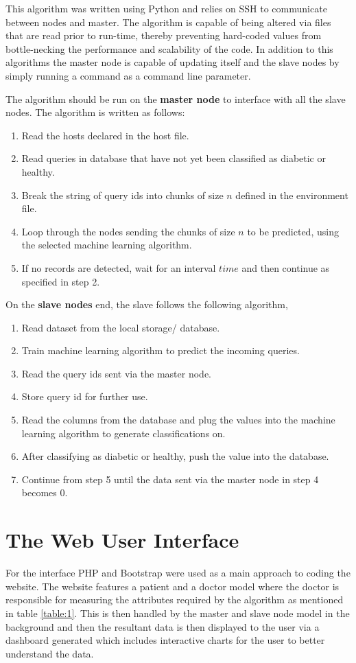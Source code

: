 \documentclass[12pt]{article}
\begin{document}
This algorithm was written using Python and relies on SSH to communicate between nodes and master. The algorithm is capable of being altered via files that are read prior to run-time, thereby preventing hard-coded values from bottle-necking the performance and scalability of the code. In addition to this algorithms the master node is capable of updating itself and the slave nodes by simply running a command as a command line parameter.

The algorithm should be run on the \textbf{master node} to interface with all the slave nodes. The algorithm is written as follows:
\begin{enumerate}
\item Read the hosts declared in the host file.
\item Read queries in database that have not yet been classified as diabetic or healthy.
\item Break the string of query ids into chunks of size $n$ defined in the environment file.
\item Loop through the nodes sending the chunks of size $n$ to be predicted, using the selected machine learning algorithm.
\item If no records are detected, wait for an interval $time$ and then continue as specified in step 2.
\end{enumerate}

On the \textbf{slave nodes} end, the slave follows the following algorithm, 
\begin{enumerate}
\item Read dataset from the local storage/ database.
\item Train machine learning algorithm to predict the incoming queries.
\item Read the query ids sent via the master node.
\item Store query id for further use.
\item Read the columns from the database and plug the values into the machine learning algorithm to generate  classifications on.
\item After classifying as diabetic or healthy, push the value into the database.
\item Continue from step 5 until the data sent via the master node in step 4 becomes 0.
\end{enumerate}

\newpage
\section{The Web User Interface}
For the interface PHP and Bootstrap were used as a main approach to coding the website. The website features a patient and a doctor model where the doctor is responsible for measuring the attributes required by the algorithm as mentioned in table \ref{table:1}. This is then handled by the master and slave node model in the background and then the resultant data is then displayed to the user via a dashboard generated which includes interactive charts for the user to better understand the data.
\end{document}
